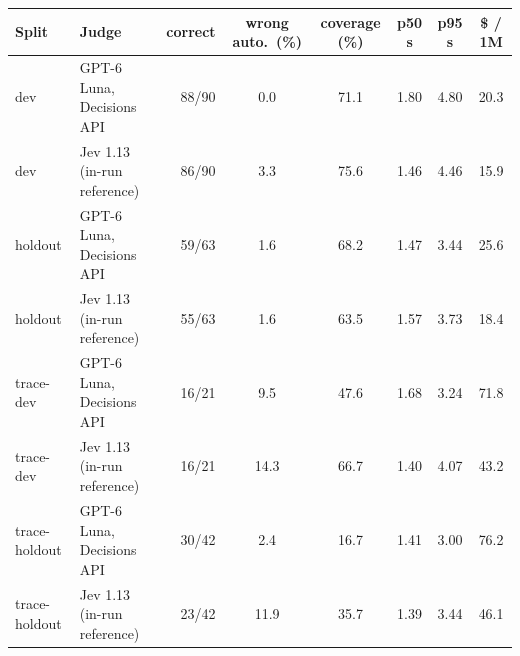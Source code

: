 \begin{tabular*}{\textwidth}{@{\extracolsep{\fill}}l l r S[table-format=2.1] S[table-format=2.1] S[table-format=1.2] S[table-format=1.2] S[table-format=2.1]@{}}
\toprule
Split & Judge & correct & {wrong auto.\ (\%)} & {coverage (\%)} & {p50 s} & {p95 s} & {\$ / 1M} \\
\midrule
dev & GPT-6 Luna, Decisions API & 88/90 & 0.0 & 71.1 & 1.80 & 4.80 & 20.3 \\
dev & Jev 1.13 (in-run reference) & 86/90 & 3.3 & 75.6 & 1.46 & 4.46 & 15.9 \\
\addlinespace[2pt]
holdout & GPT-6 Luna, Decisions API & 59/63 & 1.6 & 68.2 & 1.47 & 3.44 & 25.6 \\
holdout & Jev 1.13 (in-run reference) & 55/63 & 1.6 & 63.5 & 1.57 & 3.73 & 18.4 \\
\addlinespace[2pt]
trace-dev & GPT-6 Luna, Decisions API & 16/21 & 9.5 & 47.6 & 1.68 & 3.24 & 71.8 \\
trace-dev & Jev 1.13 (in-run reference) & 16/21 & 14.3 & 66.7 & 1.40 & 4.07 & 43.2 \\
\addlinespace[2pt]
trace-holdout & GPT-6 Luna, Decisions API & 30/42 & 2.4 & 16.7 & 1.41 & 3.00 & 76.2 \\
trace-holdout & Jev 1.13 (in-run reference) & 23/42 & 11.9 & 35.7 & 1.39 & 3.44 & 46.1 \\
\bottomrule
\end{tabular*}
